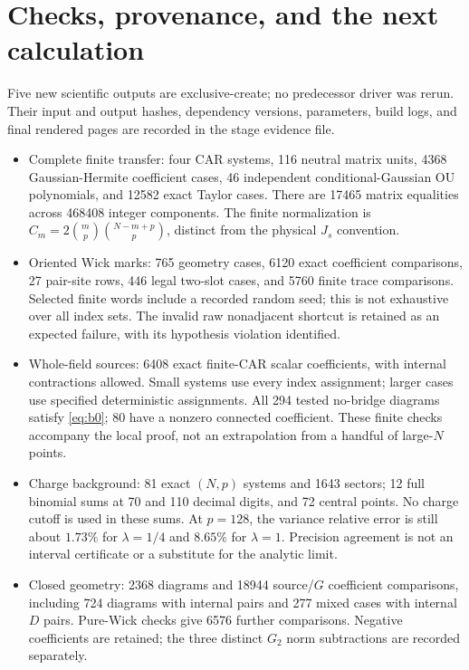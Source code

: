 \documentclass[11pt]{article}
\begin{document}
\section{Checks, provenance, and the next calculation}
Five new scientific outputs are exclusive-create; no predecessor
driver was rerun. Their input and output hashes, dependency versions,
parameters, build logs, and final rendered pages are recorded in the
stage evidence file.
\begin{itemize}
\item Complete finite transfer: four CAR systems, 116 neutral matrix
units, 4368 Gaussian-Hermite coefficient cases, 46 independent
conditional-Gaussian OU polynomials, and 12582 exact Taylor cases.
There are 17465 matrix equalities across 468408 integer components.
The finite normalization is $C_m=2\binom mp\binom{N-m+p}p$,
distinct from the physical $J_s$ convention.
\item Oriented Wick marks: 765 geometry cases, 6120 exact coefficient
comparisons, 27 pair-site rows, 446 legal two-slot cases, and
5760 finite trace comparisons. Selected finite words include a
recorded random seed; this is not exhaustive over all index sets.
The invalid raw nonadjacent shortcut is retained as an expected
failure, with its hypothesis violation identified.
\item Whole-field sources: 6408 exact finite-CAR scalar coefficients,
with internal contractions allowed. Small systems use every index
assignment; larger cases use specified deterministic assignments.
All 294 tested no-bridge diagrams satisfy \eqref{eq:b0}; 80 have a
nonzero connected coefficient. These finite checks accompany the
local proof, not an extrapolation from a handful of large-$N$ points.
\item Charge background: 81 exact $(N,p)$ systems and 1643 sectors;
12 full binomial sums at 70 and 110 decimal digits, and 72 central
points. No charge cutoff is used in these sums. At $p=128$, the
variance relative error is still about $1.73\%$ for $\lambda=1/4$
and $8.65\%$ for $\lambda=1$. Precision agreement is not an
interval certificate or a substitute for the analytic limit.
\item Closed geometry: 2368 diagrams and 18944 source/$G$ coefficient
comparisons, including 724 diagrams with internal pairs and 277
mixed cases with internal $D$ pairs. Pure-Wick checks give 6576
further comparisons. Negative coefficients are retained; the three
distinct $G_2$ norm subtractions are recorded separately.
\end{itemize}
\end{document}
